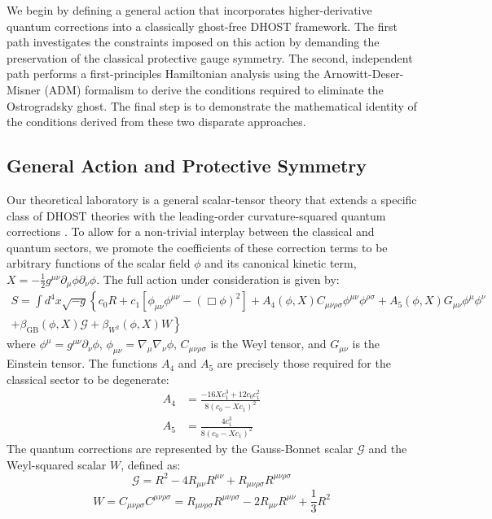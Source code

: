 \documentclass[twocolumn]{aastex631}
\begin{document}
We begin by defining a general action that incorporates higher-derivative quantum corrections into a classically ghost-free DHOST framework. The first path investigates the constraints imposed on this action by demanding the preservation of the classical protective gauge symmetry. The second, independent path performs a first-principles Hamiltonian analysis using the Arnowitt-Deser-Misner (ADM) formalism to derive the conditions required to eliminate the Ostrogradsky ghost. The final step is to demonstrate the mathematical identity of the conditions derived from these two disparate approaches.

\subsection{General Action and Protective Symmetry}
Our theoretical laboratory is a general scalar-tensor theory that extends a specific class of DHOST theories \citep{yousaf2024orthogonalsplittingdegeneratehigherorder} with the leading-order curvature-squared quantum corrections \citep{villegas2024quantumhighercurvaturecorrections}. To allow for a non-trivial interplay between the classical and quantum sectors, we promote the coefficients of these correction terms to be arbitrary functions of the scalar field $\phi$ and its canonical kinetic term, $X = -\frac{1}{2} g^{\mu\nu}\partial_\mu\phi\partial_\nu\phi$. The full action under consideration is given by:
\begin{multline}S = \int d^4x \sqrt{-g} \left\{ c_0 R + c_1 \left[\phi_{\mu\nu}\phi^{\mu\nu} - (\Box\phi)^2\right] + A_4(\phi, X) C_{\mu\nu\rho\sigma} \phi^{\mu\nu}\phi^{\rho\sigma} + A_5(\phi, X) G_{\mu\nu}\phi^\mu\phi^\nu \right. \\\left. + \beta_{\text{GB}}(\phi, X) \mathcal{G} + \beta_{W^2}(\phi, X) W \right\}\end{multline}
where $\phi^\mu = g^{\mu\nu}\partial_\nu\phi$, $\phi_{\mu\nu} = \nabla_\mu\nabla_\nu\phi$, $C_{\mu\nu\rho\sigma}$ is the Weyl tensor, and $G_{\mu\nu}$ is the Einstein tensor. The functions $A_4$ and $A_5$ are precisely those required for the classical sector to be degenerate:
\begin{align}
A_4 &= \frac{-16Xc_1^3 + 12c_0c_1^2}{8(c_0 - Xc_1)^2} \\
A_5 &= \frac{4c_1^3}{8(c_0 - Xc_1)^2}
\end{align}
The quantum corrections are represented by the Gauss-Bonnet scalar $\mathcal{G}$ and the Weyl-squared scalar $W$, defined as: \citep{baykal2010unifiedapproachvariationalderivatives,rachwał2022understandstructurebetafunctions}
\begin{equation}
\mathcal{G} = R^2 - 4R_{\mu\nu}R^{\mu\nu} + R_{\mu\nu\rho\sigma}R^{\mu\nu\rho\sigma}
\end{equation}
\begin{equation}
W = C_{\mu\nu\rho\sigma}C^{\mu\nu\rho\sigma} = R_{\mu\nu\rho\sigma}R^{\mu\nu\rho\sigma} - 2R_{\mu\nu}R^{\mu\nu} + \frac{1}{3}R^2
\end{equation}
\citep{pommaret2016bianchiidentitiesriemannweyl}
\end{document}

